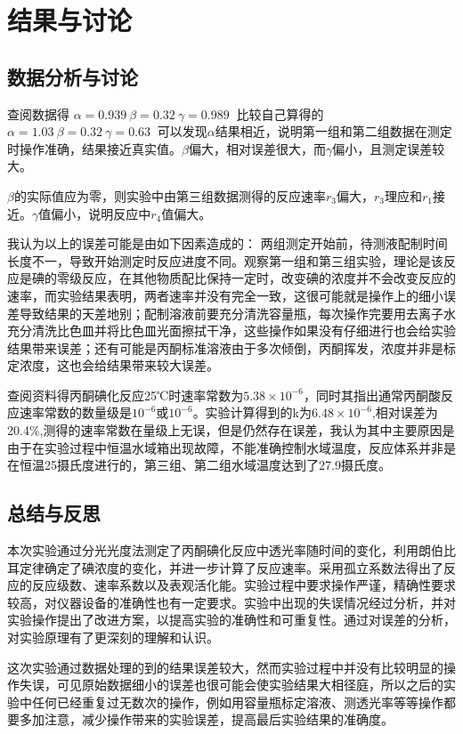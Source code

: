 \documentclass[hyperref,a4paper,UTF8]{ctexart}
\begin{document}
\section{结果与讨论}
\subsection{数据分析与讨论}

查阅数据得
$
    \alpha=0.939 \
    \beta=0.32 \
    \gamma = 0.989 \
$
比较自己算得的
$
    \alpha=1.03\
    \beta=0.32\
    \gamma = 0.63\
$
可以发现$\alpha$结果相近，说明第一组和第二组数据在测定时操作准确，结果接近真实值。$\beta$偏大，相对误差很大，而$\gamma$偏小，且测定误差较大。

$\beta$的实际值应为零，则实验中由第三组数据测得的反应速率$r_3$偏大，$r_3$理应和$r_1$接近。$\gamma$值偏小，说明反应中$r_4$值偏大。

我认为以上的误差可能是由如下因素造成的：
 两组测定开始前，待测液配制时间长度不一，导致开始测定时反应进度不同。观察第一组和第三组实验，理论是该反应是碘的零级反应，在其他物质配比保持一定时，改变碘的浓度并不会改变反应的速率，而实验结果表明，两者速率并没有完全一致，这很可能就是操作上的细小误差导致结果的天差地别；配制溶液前要充分清洗容量瓶，每次操作完要用去离子水充分清洗比色皿并将比色皿光面擦拭干净，这些操作如果没有仔细进行也会给实验结果带来误差；还有可能是丙酮标准溶液由于多次倾倒，丙酮挥发，浓度并非是标定浓度，这也会给结果带来较大误差。


查阅资料得丙酮碘化反应25℃时速率常数为$5.38 \times 10^{-6}$，同时其指出通常丙酮酸反应速率常数的数量级是$10^{-6}$或$10^{-6}$。实验计算得到的k为$6.48 \times 10^{-6}$,相对误差为20.4\%,测得的速率常数在量级上无误，但是仍然存在误差，我认为其中主要原因是由于在实验过程中恒温水域箱出现故障，不能准确控制水域温度，反应体系并非是在恒温25摄氏度进行的，第三组、第二组水域温度达到了27.9摄氏度。

\subsection{总结与反思}

本次实验通过分光光度法测定了丙酮碘化反应中透光率随时间的变化，利用朗伯比耳定律确定了碘浓度的变化，并进一步计算了反应速率。采用孤立系数法得出了反应的反应级数、速率系数以及表观活化能。实验过程中要求操作严谨，精确性要求较高，对仪器设备的准确性也有一定要求。实验中出现的失误情况经过分析，并对实验操作提出了改进方案，以提高实验的准确性和可重复性。通过对误差的分析，对实验原理有了更深刻的理解和认识。

这次实验通过数据处理的到的结果误差较大，然而实验过程中并没有比较明显的操作失误，可见原始数据细小的误差也很可能会使实验结果大相径庭，所以之后的实验中任何已经重复过无数次的操作，例如用容量瓶标定溶液、测透光率等等操作都要多加注意，减少操作带来的实验误差，提高最后实验结果的准确度。
\end{document}
